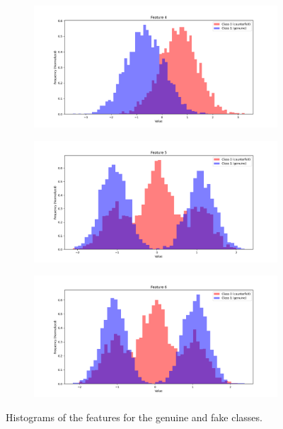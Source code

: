 \documentclass[12pt]{report}
\begin{document}
\begin{figure}[H]
\begin{subfigure}[t]{0.49\textwidth}
    \end{subfigure}
    \hfill
    \begin{subfigure}[t]{0.49\textwidth}
        \includegraphics[width=\textwidth]{./plot/features/feature_4.png}
    \end{subfigure}
    \begin{subfigure}[t]{0.49\textwidth}
        \includegraphics[width=\textwidth]{./plot/features/feature_5.png}
    \end{subfigure}
    \hfill
    \begin{subfigure}[t]{0.49\textwidth}
        \includegraphics[width=\textwidth]{./plot/features/feature_6.png}
    \end{subfigure}
    \caption{Histograms of the features for the genuine and fake classes.}
    \label{fig:histograms}
\end{figure}
\end{document}
